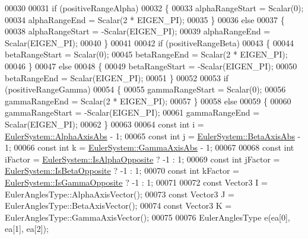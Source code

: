 \begin{DoxyCode}
00030   
00031   \textcolor{keywordflow}{if} (positiveRangeAlpha)
00032   \{
00033     alphaRangeStart = Scalar(0);
00034     alphaRangeEnd = Scalar(2 * EIGEN\_PI);
00035   \}
00036   \textcolor{keywordflow}{else}
00037   \{
00038     alphaRangeStart = -Scalar(EIGEN\_PI);
00039     alphaRangeEnd = Scalar(EIGEN\_PI);
00040   \}
00041   
00042   \textcolor{keywordflow}{if} (positiveRangeBeta)
00043   \{
00044     betaRangeStart = Scalar(0);
00045     betaRangeEnd = Scalar(2 * EIGEN\_PI);
00046   \}
00047   \textcolor{keywordflow}{else}
00048   \{
00049     betaRangeStart = -Scalar(EIGEN\_PI);
00050     betaRangeEnd = Scalar(EIGEN\_PI);
00051   \}
00052   
00053   \textcolor{keywordflow}{if} (positiveRangeGamma)
00054   \{
00055     gammaRangeStart = Scalar(0);
00056     gammaRangeEnd = Scalar(2 * EIGEN\_PI);
00057   \}
00058   \textcolor{keywordflow}{else}
00059   \{
00060     gammaRangeStart = -Scalar(EIGEN\_PI);
00061     gammaRangeEnd = Scalar(EIGEN\_PI);
00062   \}
00063   
00064   \textcolor{keyword}{const} \textcolor{keywordtype}{int} i = \hyperlink{class_eigen_1_1_euler_system_ab1604e0e8eb9b72fa937236fdb9fd68da54814e9f1958769932e1f1a2047701b8}{EulerSystem::AlphaAxisAbs} - 1;
00065   \textcolor{keyword}{const} \textcolor{keywordtype}{int} j = \hyperlink{class_eigen_1_1_euler_system_ab1604e0e8eb9b72fa937236fdb9fd68daaea3c35e3fd2cab857f0b37feaa80c05}{EulerSystem::BetaAxisAbs} - 1;
00066   \textcolor{keyword}{const} \textcolor{keywordtype}{int} k = \hyperlink{class_eigen_1_1_euler_system_ab1604e0e8eb9b72fa937236fdb9fd68daef2019be264b8fb5dbd4a5ca4f118b29}{EulerSystem::GammaAxisAbs} - 1;
00067   
00068   \textcolor{keyword}{const} \textcolor{keywordtype}{int} iFactor = \hyperlink{class_eigen_1_1_euler_system_ab1604e0e8eb9b72fa937236fdb9fd68daac88718d0bd48e25e3e715af12342de7}{EulerSystem::IsAlphaOpposite} ? -1 : 1;
00069   \textcolor{keyword}{const} \textcolor{keywordtype}{int} jFactor = \hyperlink{class_eigen_1_1_euler_system_ab1604e0e8eb9b72fa937236fdb9fd68da659596aeadc17ade7dff5b8740c04ca8}{EulerSystem::IsBetaOpposite} ? -1 : 1;
00070   \textcolor{keyword}{const} \textcolor{keywordtype}{int} kFactor = \hyperlink{class_eigen_1_1_euler_system_ab1604e0e8eb9b72fa937236fdb9fd68da6779029ac21bd5102818c8ea8cf6c031}{EulerSystem::IsGammaOpposite} ? -1 : 1;
00071   
00072   \textcolor{keyword}{const} Vector3 I = EulerAnglesType::AlphaAxisVector();
00073   \textcolor{keyword}{const} Vector3 J = EulerAnglesType::BetaAxisVector();
00074   \textcolor{keyword}{const} Vector3 K = EulerAnglesType::GammaAxisVector();
00075   
00076   EulerAnglesType e(ea[0], ea[1], ea[2]);

\end{DoxyCode}
